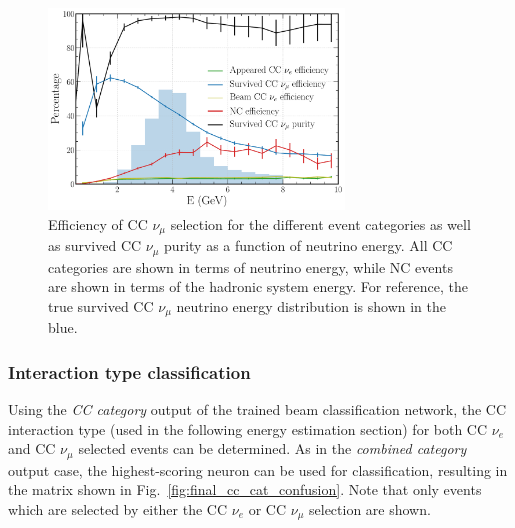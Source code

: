 \begin{figure} %
    \includegraphics[width=0.7\textwidth]{diagrams/6-cvn/chipsnet/final_numu_hists.pdf}
    \caption[Efficiency of CC $\nu_{\mu}$ selection as a function of energy.]
    {Efficiency of CC $\nu_{\mu}$ selection for the different event categories as well as survived
        CC $\nu_{\mu}$ purity as a function of neutrino energy. All CC categories are shown in
        terms of neutrino energy, while NC events are shown in terms of the hadronic system
        energy. For reference, the true survived CC $\nu_{\mu}$ neutrino energy distribution is
        shown in the blue.}
    \label{fig:final_numu_hists}
\end{figure}

\subsubsection*{Interaction type classification} %

Using the \emph{CC category} output of the trained beam classification network, the CC interaction
type (used in the following energy estimation section) for both CC $\nu_{e}$ and CC $\nu_{\mu}$
selected events can be determined. As in the \emph{combined category} output case, the
highest-scoring neuron can be used for classification, resulting in the matrix shown in
Fig.~\ref{fig:final_cc_cat_confusion}. Note that only events which are selected by either the CC
$\nu_{e}$ or CC $\nu_{\mu}$ selection are shown.

